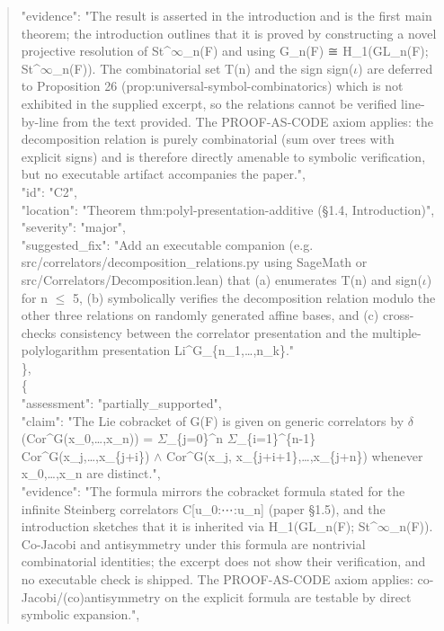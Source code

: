 \documentclass[11pt]{article}
\begin{document}
\begin{quote}
      "evidence": "The result is asserted in the introduction and is the first main theorem; the introduction outlines that it is proved by constructing a novel projective resolution of St\^{}\ensuremath{\infty}\_n(F) and using G\_n(F) ≅ H\_1(GL\_n(F); St\^{}\ensuremath{\infty}\_n(F)). The combinatorial set T(n) and the sign sign(\ensuremath{\iota}) are deferred to Proposition 26 (prop:universal-symbol-combinatorics) which is not exhibited in the supplied excerpt, so the relations cannot be verified line-by-line from the text provided. The PROOF-AS-CODE axiom applies: the decomposition relation is purely combinatorial (sum over trees with explicit signs) and is therefore directly amenable to symbolic verification, but no executable artifact accompanies the paper.",\\
      "id": "C2",\\
      "location": "Theorem thm:polyl-presentation-additive (§1.4, Introduction)",\\
      "severity": "major",\\
      "suggested\_fix": "Add an executable companion (e.g. src/correlators/decomposition\_relations.py using SageMath or src/Correlators/Decomposition.lean) that (a) enumerates T(n) and sign(\ensuremath{\iota}) for n \ensuremath{\le} 5, (b) symbolically verifies the decomposition relation modulo the other three relations on randomly generated affine bases, and (c) cross-checks consistency between the correlator presentation and the multiple-polylogarithm presentation Li\^{}G\_\{n\_1,…,n\_k\}."\\
    \},\\
    \{\\
      "assessment": "partially\_supported",\\
      "claim": "The Lie cobracket of G(F) is given on generic correlators by \ensuremath{\delta}(Cor\^{}G(x\_0,…,x\_n)) = \ensuremath{\Sigma}\_\{j=0\}\^{}n \ensuremath{\Sigma}\_\{i=1\}\^{}\{n-1\} Cor\^{}G(x\_j,…,x\_\{j+i\}) \ensuremath{\wedge} Cor\^{}G(x\_j, x\_\{j+i+1\},…,x\_\{j+n\}) whenever x\_0,…,x\_n are distinct.",\\
      "evidence": "The formula mirrors the cobracket formula stated for the infinite Steinberg correlators C[u\_0:⋯:u\_n] (paper §1.5), and the introduction sketches that it is inherited via H\_1(GL\_n(F); St\^{}\ensuremath{\infty}\_n(F)). Co-Jacobi and antisymmetry under this formula are nontrivial combinatorial identities; the excerpt does not show their verification, and no executable check is shipped. The PROOF-AS-CODE axiom applies: co-Jacobi/(co)antisymmetry on the explicit formula are testable by direct symbolic expansion.",\\

\end{quote}
\end{document}
